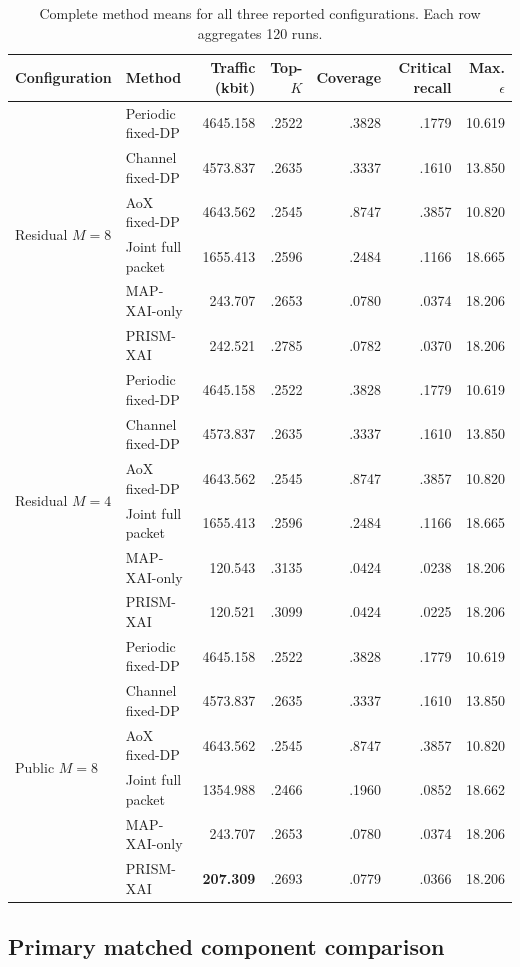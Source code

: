 \documentclass[10pt,conference]{IEEEtran}
\begin{document}
\begin{table}[htbp]
\caption{Complete method means for all three reported configurations. Each row
aggregates 120 runs.}
\label{tab:completemeans}
\centering\scriptsize
\begin{tabular}{llrrrrr}
\toprule
Configuration & Method & Traffic (kbit) & Top-$K$ & Coverage & Critical recall & Max. $\epsilon$\\ \midrule
\multirow{6}{*}{Residual $M=8$}
& Periodic fixed-DP & 4645.158 & .2522 & .3828 & .1779 & 10.619\\
& Channel fixed-DP & 4573.837 & .2635 & .3337 & .1610 & 13.850\\
& AoX fixed-DP & 4643.562 & .2545 & .8747 & .3857 & 10.820\\
& Joint full packet & 1655.413 & .2596 & .2484 & .1166 & 18.665\\
& MAP-XAI-only & 243.707 & .2653 & .0780 & .0374 & 18.206\\
& PRISM-XAI & 242.521 & .2785 & .0782 & .0370 & 18.206\\ \midrule
\multirow{6}{*}{Residual $M=4$}
& Periodic fixed-DP & 4645.158 & .2522 & .3828 & .1779 & 10.619\\
& Channel fixed-DP & 4573.837 & .2635 & .3337 & .1610 & 13.850\\
& AoX fixed-DP & 4643.562 & .2545 & .8747 & .3857 & 10.820\\
& Joint full packet & 1655.413 & .2596 & .2484 & .1166 & 18.665\\
& MAP-XAI-only & 120.543 & .3135 & .0424 & .0238 & 18.206\\
& PRISM-XAI & 120.521 & .3099 & .0424 & .0225 & 18.206\\ \midrule
\multirow{6}{*}{Public $M=8$}
& Periodic fixed-DP & 4645.158 & .2522 & .3828 & .1779 & 10.619\\
& Channel fixed-DP & 4573.837 & .2635 & .3337 & .1610 & 13.850\\
& AoX fixed-DP & 4643.562 & .2545 & .8747 & .3857 & 10.820\\
& Joint full packet & 1354.988 & .2466 & .1960 & .0852 & 18.662\\
& MAP-XAI-only & 243.707 & .2653 & .0780 & .0374 & 18.206\\
& PRISM-XAI & \textbf{207.309} & .2693 & .0779 & .0366 & 18.206\\
\bottomrule
\end{tabular}
\end{table}

\subsection{Primary matched component comparison}
\end{document}
